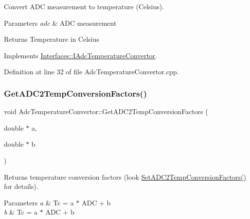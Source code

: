 Convert A\+DC measurement to temperature (Celsius). 


\begin{DoxyParams}{Parameters}
{\em adc} & A\+DC measurement \\
\hline
\end{DoxyParams}
\begin{DoxyReturn}{Returns}
Temperature in Celsius 
\end{DoxyReturn}


Implements \hyperlink{class_interfaces_1_1_i_adc_temperature_convertor_aa6283c62cbbb012954b5e51d7a969385}{Interfaces\+::\+I\+Adc\+Temperature\+Convertor}.



Definition at line 32 of file Adc\+Temperature\+Convertor.\+cpp.

\mbox{\label{class_adc_temperature_convertor_af7c23effdc32aa35c14813fd334572f2}} 
\subsubsection{\texorpdfstring{Get\+A\+D\+C2\+Temp\+Conversion\+Factors()}{GetADC2TempConversionFactors()}}
{\footnotesize\ttfamily void Adc\+Temperature\+Convertor\+::\+Get\+A\+D\+C2\+Temp\+Conversion\+Factors (\begin{DoxyParamCaption}\item[{double $\ast$}]{a,  }\item[{double $\ast$}]{b }\end{DoxyParamCaption})\hspace{0.3cm}{\ttfamily [virtual]}}



Returns temperature conversion factors (look \hyperlink{class_adc_temperature_convertor_a4850843e55992608213cc9cf82d36830}{Set\+A\+D\+C2\+Temp\+Conversion\+Factors()} for details). 


\begin{DoxyParams}{Parameters}
{\em a} & Tc = a $\ast$ A\+DC + b \\
\hline
{\em b} & Tc = a $\ast$ A\+DC + b \\
\hline
\end{DoxyParams}


